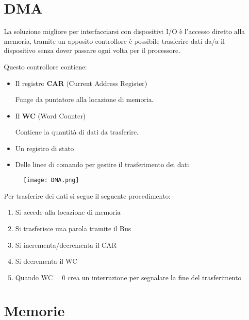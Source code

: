 \documentclass{article}
\begin{document}
\section{DMA}

La soluzione migliore per interfacciarsi con dispositivi I/O è l'accesso diretto alla memoria, tramite un apposito controllore è possibile trasferire dati da/a il dispositivo senza dover passare ogni volta per il processore.\newline

\noindent Questo controllore contiene:
\begin{itemize}
    \item Il registro \textbf{CAR} (Current Address Register)

        Funge da puntatore alla locazione di memoria.

    \item Il \textbf{WC} (Word Counter)

        Contiene la quantità di dati da trasferire.

    \item Un registro di stato

    \item Delle linee di comando per gestire il trasferimento dei dati\newline
    
\end{itemize}

\begin{figure}[ht]
    \centering
    \texttt{[image: DMA.png]}
    \label{fig:dma}
\end{figure}

\noindent Per trasferire dei dati si segue il seguente procedimento:
\begin{enumerate}
    \item Si accede alla locazione di memoria 
    \item Si trasferisce una parola tramite il Bus
    \item Si incrementa/decrementa il CAR
    \item Si decrementa il WC
    \item Quando WC$=0$ crea un interruzione per segnalare la fine del trasferimento
\end{enumerate}

\section{Memorie}
\end{document}
